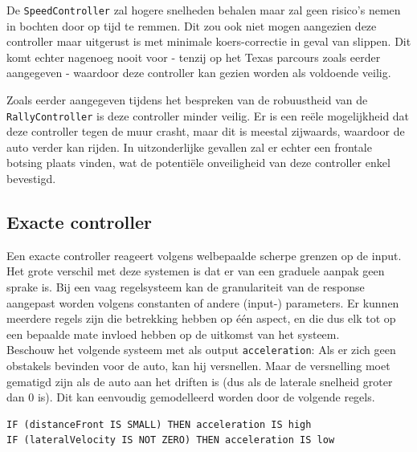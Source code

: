\documentclass[10pt,a4paper]{article}
\begin{document}
			De \texttt{SpeedController} zal hogere snelheden behalen maar zal geen risico's nemen in bochten door op tijd te remmen. Dit zou ook niet mogen aangezien deze controller maar uitgerust is met minimale koers-correctie in geval van slippen. Dit komt echter nagenoeg nooit voor - tenzij op het Texas parcours zoals eerder aangegeven - waardoor deze controller kan gezien worden als voldoende veilig.

			Zoals eerder aangegeven tijdens het bespreken van de robuustheid van de \texttt{RallyController} is deze controller minder veilig. Er is een reële mogelijkheid dat deze controller tegen de muur crasht, maar dit is meestal zijwaards, waardoor de auto verder kan rijden. In uitzonderlijke gevallen zal er echter een frontale botsing plaats vinden, wat de potentiële onveiligheid van deze controller enkel bevestigd.



		\subsection{Exacte controller}
			Een exacte controller reageert volgens welbepaalde scherpe grenzen op de input. Het grote verschil met deze systemen is dat er van een graduele aanpak geen sprake is. Bij een vaag regelsysteem kan de granulariteit van de response aangepast worden volgens constanten of andere (input-) parameters. Er kunnen meerdere regels zijn die betrekking hebben op \'e\'en aspect, en die dus elk tot op een bepaalde mate invloed hebben op de uitkomst van het systeem. \\

			Beschouw het volgende systeem met als output \texttt{acceleration}: Als er zich geen obstakels bevinden voor de auto, kan hij versnellen. Maar de versnelling moet gematigd zijn als de auto aan het driften is (dus als de laterale snelheid groter dan 0 is).
			Dit kan eenvoudig gemodelleerd worden door de volgende regels.

			\begin{lstlisting}
IF (distanceFront IS SMALL) THEN acceleration IS high
IF (lateralVelocity IS NOT ZERO) THEN acceleration IS low
			\end{lstlisting}
\end{document}
